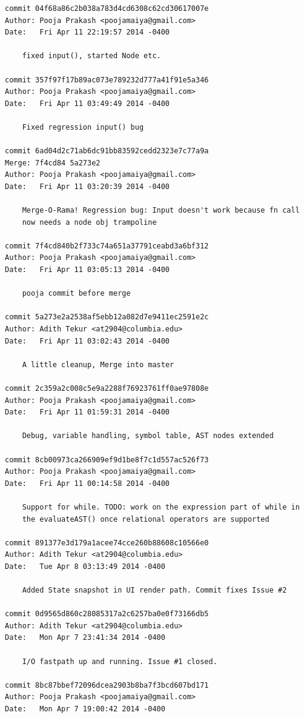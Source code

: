 \documentclass[a4paper]{article}
\begin{document}
\begin{verbatim}
commit 04f68a86c2b038a783d4cd6308c62cd30617007e
Author: Pooja Prakash <poojamaiya@gmail.com>
Date:   Fri Apr 11 22:19:57 2014 -0400

    fixed input(), started Node etc.

commit 357f97f17b89ac073e789232d777a41f91e5a346
Author: Pooja Prakash <poojamaiya@gmail.com>
Date:   Fri Apr 11 03:49:49 2014 -0400

    Fixed regression input() bug

commit 6ad04d2c71ab6dc91bb83592cedd2323e7c77a9a
Merge: 7f4cd84 5a273e2
Author: Pooja Prakash <poojamaiya@gmail.com>
Date:   Fri Apr 11 03:20:39 2014 -0400

    Merge-O-Rama! Regression bug: Input doesn't work because fn call 
    now needs a node obj trampoline

commit 7f4cd840b2f733c74a651a37791ceabd3a6bf312
Author: Pooja Prakash <poojamaiya@gmail.com>
Date:   Fri Apr 11 03:05:13 2014 -0400

    pooja commit before merge

commit 5a273e2a2538af5ebb12a082d7e9411ec2591e2c
Author: Adith Tekur <at2904@columbia.edu>
Date:   Fri Apr 11 03:02:43 2014 -0400

    A little cleanup, Merge into master

commit 2c359a2c008c5e9a2288f76923761ff0ae97808e
Author: Pooja Prakash <poojamaiya@gmail.com>
Date:   Fri Apr 11 01:59:31 2014 -0400

    Debug, variable handling, symbol table, AST nodes extended

commit 8cb00973ca266909ef9d1be8f7c1d557ac526f73
Author: Pooja Prakash <poojamaiya@gmail.com>
Date:   Fri Apr 11 00:14:58 2014 -0400

    Support for while. TODO: work on the expression part of while in 
    the evaluateAST() once relational operators are supported

commit 891377e3d179a1acee74cce260b88608c10566e0
Author: Adith Tekur <at2904@columbia.edu>
Date:   Tue Apr 8 03:13:49 2014 -0400

    Added State snapshot in UI render path. Commit fixes Issue #2

commit 0d9565d860c28085317a2c6257ba0e0f73166db5
Author: Adith Tekur <at2904@columbia.edu>
Date:   Mon Apr 7 23:41:34 2014 -0400

    I/O fastpath up and running. Issue #1 closed.

commit 8bc87bbef72096dcea2903b8ba7f3bcd607bd171
Author: Pooja Prakash <poojamaiya@gmail.com>
Date:   Mon Apr 7 19:00:42 2014 -0400


\end{verbatim}
\end{document}
